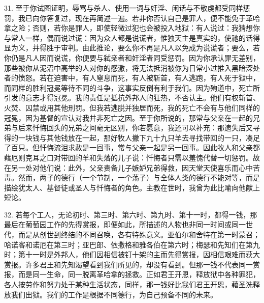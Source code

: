 31. 至于你试图证明，辱骂与杀人、使用一词与奸淫、闲话与不敬虔都受同样惩罚，我已向你答复过，现在再简述一遍。若非你否认自己是罪人，便不能免于革哈拿之险；否则，若你是罪人，即使轻微过犯也会被投入地狱：有人说过：我猜想你与常人一样，偶而说过谎：因为众人都是说谎者，惟独天主是真实的，使祂的话得显为义，并得胜于审判。由此推论，要么你不再是凡人以免成为说谎者；要么，若你仍是凡人因而说谎，你便要与弑亲者和奸淫者同受惩罚。因为你承认罪无差别，那些被你从泥沼中高举的人对你的感激，将无法抵消被你为日常小过推入黑暗深处者的愤怒。若在迫害中，有人窒息而死，有人被斩首，有人逃跑，有人死于狱中，而同样的胜利冠冕等待不同的斗争，这事实反倒有利于我们。因为殉道中，死亡所引发的意志才得冠冕。我的责任是抵抗外邦人的狂热，不否认主。他们有权斩首、火焚、囚禁或用其他刑罚。但我若逃脱并独居而死，我的死亡不会有与他们同样的冠冕，因为基督的宣认对我并非死亡之因。至于你所说的，那常与父亲在一起的兄弟与后来忏悔回头的兄弟之间毫无区别，你若愿意，我还可以补充：那遗失后又寻得的一块钱与其他钱放在一起，那好牧人撇下九十九只羊去寻找带回的一只，凑足了百只。但忏悔流泪求赦是一回事，常与父亲一起是另一回事。因此牧人和父亲都藉厄则克耳之口对带回的羊和失落的儿子说：忏悔者只需以羞愧代替一切惩罚。故在另一处对他们说：此外，父亲责备儿子嫉妒兄弟得救，因天堂天使喜乐而心中苦毒。然而，两子的德行（一个节制，一个荡子）与全体人类的德行不能对等，而是描绘犹太人、基督徒或圣人与忏悔者的角色。主教在世时，我曾为此比喻向他献上短论。\par

32. 若每个工人，无论初时、第三时、第六时、第九时、第十一时，都得一钱，那最后在葡萄园工作的先得赏报，即便如此，所描述的人物也非同一时间或同一世代，而是从创世到终结的不同召唤，各有特殊意义。亚伯尔和舍特在第一时蒙召；哈诺客和诺厄在第三时；亚巴郎、依撒格和雅各伯在第六时；梅瑟和先知们在第九时；第十一时是外邦人，他们因相信被钉十架的主而先得赏报，因相信艰难而获大赏报。许多君王和先知渴望看到我们所见的，却没有看到。但那一钱不代表同一赏报，而是同一生命，同一脱离革哈拿的拯救。正如君王开恩，释放狱中各种罪犯，各人按劳作和努力处于某种生活状态，同样，那一钱好比我们君王开恩，藉圣洗释放我们出狱。我们的工作是根据不同德行，为自己预备不同的未来。\par

